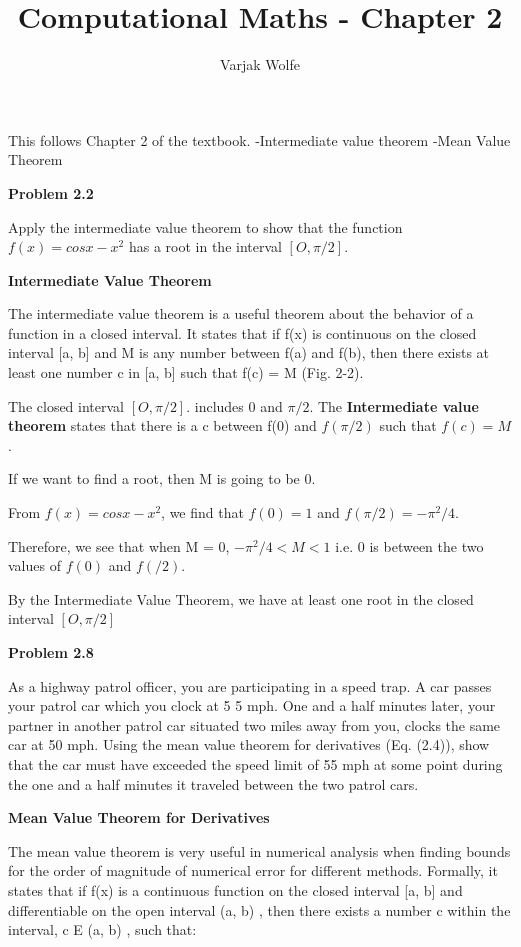 \documentclass{article}
\title{Computational Maths - Chapter 2}
\author{Varjak Wolfe}
\begin{document}
\maketitle

This follows Chapter 2 of the textbook.
-Intermediate value theorem
-Mean Value Theorem


\textbf{Problem 2.2}

Apply the intermediate value theorem to show that the function  \(f(x) = cosx -x^2\) has a root in the 
interval $[O, \pi/2]$. 

\textbf{Intermediate Value Theorem}

The intermediate value theorem is a useful theorem about the behavior of a function in a closed interval. 
It states that if f(x) is continuous on the closed interval [a, b] and M is any number between f(a) 
and f(b), then there exists at least one number c in [a, b] such that 
f(c) = M (Fig. 2-2). 


The closed interval $[O, \pi/2]$. includes $0$ and $\pi/2$.
The \textbf{Intermediate value theorem} states that there is a c between f(0) and $f(\pi/2)$ such that $f(c) = M$.

If we want to find a root, then M is going to be 0.

From \(f(x) = cosx -x^2\), we find that $f(0) = 1$ and $f(\pi/2) = -\pi^2/4$.

Therefore, we see that when M = 0, \(-\pi^2/4 < M < 1\) i.e. $0$ is between the two values of $f(0)$ and $f(/2)$. 

By the Intermediate Value Theorem, we have at least one root in the closed interval $[O, \pi/2]$


\textbf{Problem 2.8}

As a highway patrol officer, you are participating in a speed trap. A car passes your patrol car which 
you clock at 5 5 mph. One and a half minutes later, your partner in another patrol car situated two miles 
away from you, clocks the same car at 50 mph. Using the mean value theorem for derivatives (Eq. (2.4)), 
show that the car must have exceeded the speed limit of 55 mph at some point during the one and a half 
minutes it traveled between the two patrol cars. 

\textbf{Mean Value Theorem for Derivatives}

The mean value theorem is very useful in numerical analysis when finding bounds for the order of magnitude of numerical error for different 
methods. Formally, it states that if f(x) is a continuous function on the 
closed interval [a, b] and differentiable on the open interval (a, b) , then 
there exists a number c within the interval, c E (a, b) , such that:
\end{document}
